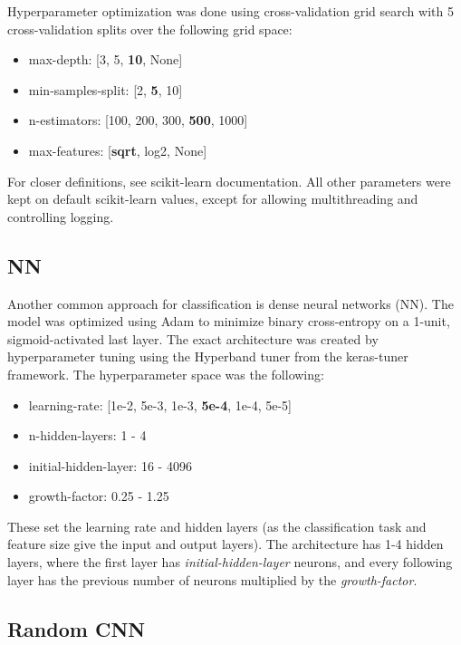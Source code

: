 Hyperparameter optimization was done using cross-validation grid search with 5 cross-validation splits over the following grid space:
\begin{itemize}
    \item max-depth: [3, 5, \textbf{10}, None]
    \item min-samples-split: [2, \textbf{5}, 10]
    \item n-estimators: [100, 200, 300, \textbf{500}, 1000]
    \item max-features: [\textbf{sqrt}, log2, None]
\end{itemize}
For closer definitions, see scikit-learn documentation. All other parameters were kept on default scikit-learn values, except for allowing multithreading and controlling logging.

\subsection{NN}

Another common approach for classification is dense neural networks (NN). The model was optimized using Adam to minimize binary cross-entropy on a 1-unit, sigmoid-activated last layer. The exact architecture was created by hyperparameter tuning using the Hyperband tuner from the keras-tuner framework.
The hyperparameter space was the following:
\begin{itemize}
    \item learning-rate: [1e-2, 5e-3, 1e-3, \textbf{5e-4}, 1e-4, 5e-5]
    \item n-hidden-layers: 1 - 4 
    \item initial-hidden-layer: 16 - 4096
    \item growth-factor: 0.25 - 1.25
\end{itemize}

These set the learning rate and hidden layers (as the classification task and feature size give the input and output layers). The architecture has 1-4 hidden layers, where the first layer has \textit{initial-hidden-layer} neurons, and every following layer has the previous number of neurons multiplied by the \textit{growth-factor}.

\subsection{Random CNN}

